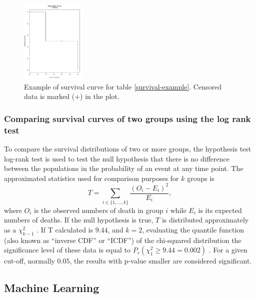 \begin{figure}
\centering
\includegraphics[width=0.5\linewidth,height=4cm]{images/example_survival.pdf}
\caption[Example of survival curve.]{
Example of survival curve for table \ref{survival-example}. Censored data is marked (+) in the plot.}
\end{figure}




\subsubsection{Comparing survival curves of two groups using the log rank test}

 To compare the survival distributions of two or more groups,  the hypothesis test log-rank test is
 used to test the null hypothesis that there is no difference between the populations
 in the probability of an event at any time point.
%
 The approximated statistics used for comparison purposes for $k$ groups is
 $$T = \sum_{i \in \{1,\ldots,k\}}\frac{(O_i - E_i)^2}{E_i},$$
 where $O_i$ is the observed numbers of death in  group $i$
 while $E_i$ is its expected numbers of deaths.
 If the null hypothesis is true, $T$ is distributed approximately as a $\chi^2_{k-1}$ \cite{matthews1996using}.
If T calculated is $9.44$, and $k = 2$,  evaluating the quantile function (also known as “inverse CDF” or “ICDF”) of the chi-squared distribution the significance level of these data is equal to
$P_r(\chi^2_{1}\geq9.44 = 0.002)$ \cite{yau2012r}.
For a given cut-off, normally $0.05$, the results with p-value smaller are considered significant.

\subsection{Machine Learning}

